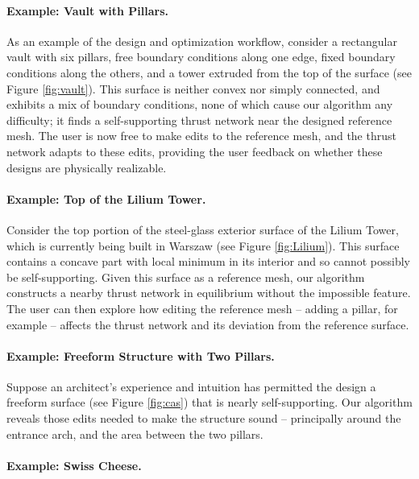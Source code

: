 \documentclass[review]{acmsiggraph}
\begin{document}
\paragraph{Example: Vault with Pillars.} As an example of the design and 
optimization workflow, consider a rectangular vault with six pillars, free 
boundary conditions along one edge, fixed boundary conditions along the 
others, and a tower extruded from the top of the surface (see Figure 
\ref{fig:vault}). This surface is neither convex nor simply connected, and 
exhibits a mix of boundary conditions, none of which cause our algorithm 
any difficulty; it finds a self-supporting thrust network near the 
designed reference mesh. The user is now free to make edits to the 
reference mesh, and the thrust network adapts to these edits, providing 
the user feedback on whether these designs are physically realizable.


\paragraph{Example: Top of the Lilium Tower.}

Consider the top portion of the steel-glass exterior surface of the Lilium 
Tower, which is currently being built in Warszaw (see Figure 
\ref{fig:Lilium}). This surface contains a concave part with local minimum 
in its interior and so cannot possibly be self-supporting. Given this 
surface as a reference mesh, our algorithm constructs a nearby thrust 
network in equilibrium without the impossible feature. The user can then 
explore how editing the reference mesh -- adding a pillar, for example -- 
affects the thrust network and its deviation from the reference surface.

\paragraph{Example: Freeform Structure with Two Pillars.}

Suppose an architect's experience and intuition has permitted the design a 
freeform surface (see Figure \ref{fig:cas}) that is nearly 
self-supporting. Our algorithm reveals those edits needed to make the 
structure sound -- principally around the entrance arch, and the area 
between the two pillars.

\paragraph{Example: Swiss Cheese.}
\end{document}

